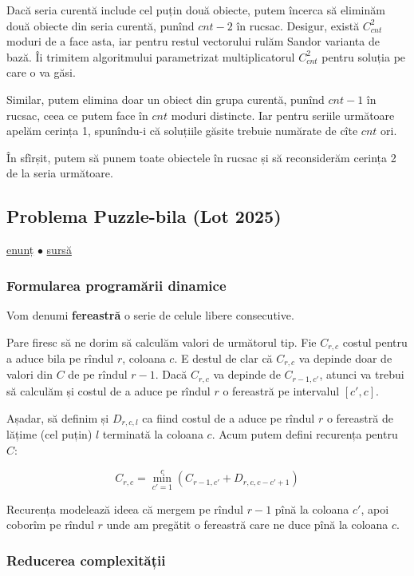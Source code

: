 Dacă seria curentă include cel puțin două obiecte, putem încerca să eliminăm două obiecte din seria curentă, punînd $cnt-2$ în rucsac. Desigur, există $C_{cnt}^2$ moduri de a face asta, iar pentru restul vectorului rulăm Sandor varianta de bază. Îi trimitem algoritmului parametrizat multiplicatorul $C_{cnt}^2$ pentru soluția pe care o va găsi.

Similar, putem elimina doar un obiect din grupa curentă, punînd $cnt-1$ în rucsac, ceea ce putem face în $cnt$ moduri distincte. Iar pentru seriile următoare apelăm cerința 1, spunîndu-i că soluțiile găsite trebuie numărate de cîte $cnt$ ori.

În sfîrșit, putem să punem toate obiectele în rucsac și să reconsiderăm cerința 2 de la seria următoare.

\subsection{Problema Puzzle-bila (Lot 2025)}
\label{problem:puzzle-bila}

\href{https://kilonova.ro/problems/3791}{enunț}
$\bullet$
\hyperref[code:puzzle-bila]{sursă}

\subsubsection*{Formularea programării dinamice}

Vom denumi \textbf{fereastră} o serie de celule libere consecutive.

Pare firesc să ne dorim să calculăm valori de următorul tip. Fie $C_{r,c}$ costul pentru a aduce bila pe rîndul $r$, coloana $c$. E destul de clar că $C_{r,c}$ va depinde doar de valori din $C$ de pe rîndul $r-1$. Dacă $C_{r,c}$ va depinde de $C_{r-1,c'}$, atunci va trebui să calculăm și costul de a aduce pe rîndul $r$ o fereastră pe intervalul $[c', c]$.

Așadar, să definim și $D_{r,c,l}$ ca fiind costul de a aduce pe rîndul $r$ o fereastră de lățime (cel puțin) $l$ terminată la coloana $c$. Acum putem defini recurența pentru $C$:

$$C_{r,c} = \min_{c'=1}^{c} (C_{r-1,c'} + D_{r,c,c-c'+1})$$

Recurența modelează ideea că mergem pe rîndul $r-1$ pînă la coloana $c'$, apoi coborîm pe rîndul $r$ unde am pregătit o fereastră care ne duce pînă la coloana $c$.

\subsubsection*{Reducerea complexității}

